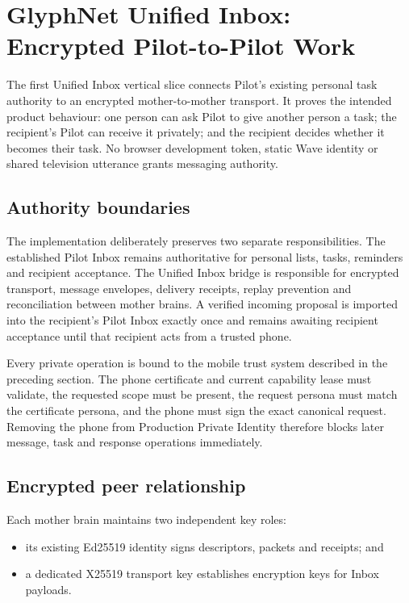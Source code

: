 \section{GlyphNet Unified Inbox: Encrypted Pilot-to-Pilot Work}

The first Unified Inbox vertical slice connects Pilot's existing personal task authority to an
encrypted mother-to-mother transport.  It proves the intended product behaviour: one person can
ask Pilot to give another person a task; the recipient's Pilot can receive it privately; and the
recipient decides whether it becomes their task.  No browser development token, static Wave
identity or shared television utterance grants messaging authority.

\subsection{Authority boundaries}

The implementation deliberately preserves two separate responsibilities.  The established
Pilot Inbox remains authoritative for personal lists, tasks, reminders and recipient
acceptance.  The Unified Inbox bridge is responsible for encrypted transport, message
envelopes, delivery receipts, replay prevention and reconciliation between mother brains.  A
verified incoming proposal is imported into the recipient's Pilot Inbox exactly once and remains
awaiting recipient acceptance until that recipient acts from a trusted phone.

Every private operation is bound to the mobile trust system described in the preceding section.
The phone certificate and current capability lease must validate, the requested scope must be
present, the request persona must match the certificate persona, and the phone must sign the exact
canonical request.  Removing the phone from Production Private Identity therefore blocks later
message, task and response operations immediately.

\subsection{Encrypted peer relationship}

Each mother brain maintains two independent key roles:
\begin{itemize}
  \item its existing Ed25519 identity signs descriptors, packets and receipts; and
  \item a dedicated X25519 transport key establishes encryption keys for Inbox payloads.
\end{itemize}

